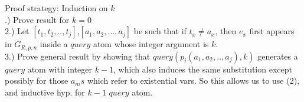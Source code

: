\documentclass{article}
\begin{document}
\newline
Proof strategy: Induction on $k$\\
.) Prove result for $k =0 $\\
2.) Let $[t_{1},t_{2},..,t_{j}]$,$[a_{1},a_{2},...,a_{j}]$ be such that if $t_{x}\neq a_{x}$, then $e_{x}$ first appears in $G_{R,p,n}$ inside a $query$ atom whose integer argument is $k$.\\ 
3.) Prove general result by showing that $query(p_{i}(a_{1},a_{2},..,a_{j}),k)$ generates a $query$ atom with integer $k-1$, which also induces the same substitution except possibly for those $a_{m}s$ which refer to existential vars. So this allows us to use (2), and inductive hyp. for $k-1$ $query$ atom.\\
\newline

























\end{document}
